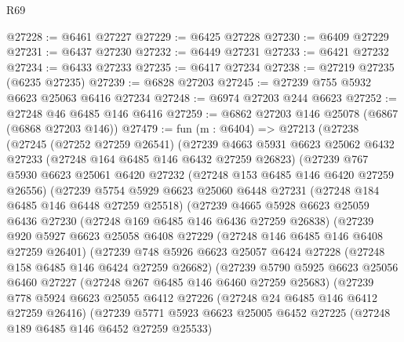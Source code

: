 \begin{lexlean}{R69}
\begin{coremodule}
{@27228 := @6461 @27227
@27229 := @6425 @27228
@27230 := @6409 @27229
@27231 := @6437 @27230
@27232 := @6449 @27231
@27233 := @6421 @27232
@27234 := @6433 @27233
@27235 := @6417 @27234
@27238 := @27219 @27235 (@6235 @27235)
@27239 := @6828 @27203
@27245 := @27239 @755 @5932 @6623 @25063 @6416 @27234
@27248 := @6974 @27203 @244 @6623
@27252 := @27248 @46 @6485 @146 @6416
@27259 := @6862 @27203 @146 @25078 (@6867 (@6868 @27203 @146))
@27479 := fun (m : @6404) =>
  @27213
    (@27238
      (@27245
        (@27252 @27259 @26541)
        (@27239
          @4663
          @5931
          @6623
          @25062
          @6432
          @27233
          (@27248 @164 @6485 @146 @6432 @27259 @26823)
          (@27239
            @767
            @5930
            @6623
            @25061
            @6420
            @27232
            (@27248 @153 @6485 @146 @6420 @27259 @26556)
            (@27239
              @5754
              @5929
              @6623
              @25060
              @6448
              @27231
              (@27248 @184 @6485 @146 @6448 @27259 @25518)
              (@27239
                @4665
                @5928
                @6623
                @25059
                @6436
                @27230
                (@27248 @169 @6485 @146 @6436 @27259 @26838)
                (@27239
                  @920
                  @5927
                  @6623
                  @25058
                  @6408
                  @27229
                  (@27248 @146 @6485 @146 @6408 @27259 @26401)
                  (@27239
                    @748
                    @5926
                    @6623
                    @25057
                    @6424
                    @27228
                    (@27248 @158 @6485 @146 @6424 @27259 @26682)
                    (@27239
                      @5790
                      @5925
                      @6623
                      @25056
                      @6460
                      @27227
                      (@27248 @267 @6485 @146 @6460 @27259 @25683)
                      (@27239
                        @778
                        @5924
                        @6623
                        @25055
                        @6412
                        @27226
                        (@27248 @24 @6485 @146 @6412 @27259 @26416)
                        (@27239
                          @5771
                          @5923
                          @6623
                          @25005
                          @6452
                          @27225
                          (@27248 @189 @6485 @146 @6452 @27259 @25533)
}
\end{coremodule}
\end{lexlean}
